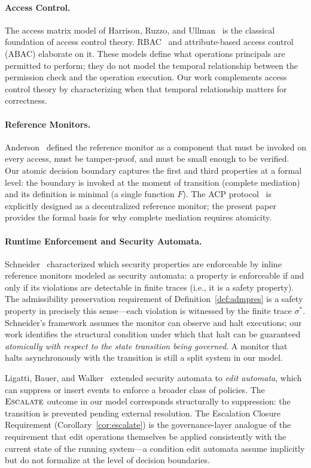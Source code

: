 \documentclass[11pt]{article}
\theoremstyle{plain}
\theoremstyle{definition}
\theoremstyle{remark}
\newcommand{\Escalate}{\textsc{Escalate}}
\begin{document}
\paragraph{Access Control.}
The access matrix model of Harrison, Ruzzo, and Ullman~\cite{hru76} is the
classical foundation of access control theory.  RBAC~\cite{sandhu96} and
attribute-based access control (ABAC) elaborate on it.  These models define
what operations principals are permitted to perform; they do not model the
temporal relationship between the permission check and the operation
execution.  Our work complements access control theory by characterizing when
that temporal relationship matters for correctness.

\paragraph{Reference Monitors.}
Anderson~\cite{anderson72} defined the reference monitor as a component that
must be invoked on every access, must be tamper-proof, and must be small
enough to be verified.  Our atomic decision boundary captures the first and
third properties at a formal level: the boundary is invoked at the moment of
transition (complete mediation) and its definition is minimal (a single
function $F$).  The ACP protocol~\cite{acp26} is explicitly designed as a
decentralized reference monitor; the present paper provides the formal basis
for why complete mediation requires atomicity.

\paragraph{Runtime Enforcement and Security Automata.}
Schneider~\cite{schneider00} characterized which security properties are
enforceable by inline reference monitors modeled as security automata: a
property is enforceable if and only if its violations are detectable in finite
traces (i.e., it is a safety property).  The admissibility preservation
requirement of Definition~\ref{def:admpres} is a safety property in precisely
this sense---each violation is witnessed by the finite trace $\sigma^*$.
Schneider's framework assumes the monitor can observe and halt executions; our
work identifies the structural condition under which that halt can be guaranteed
\emph{atomically with respect to the state transition being governed}.  A
monitor that halts asynchronously with the transition is still a split system
in our model.

Ligatti, Bauer, and Walker~\cite{ligatti05} extended security automata to
\emph{edit automata}, which can suppress or insert events to enforce a broader
class of policies.  The $\Escalate$ outcome in our model corresponds
structurally to suppression: the transition is prevented pending external
resolution.  The Escalation Closure Requirement (Corollary~\ref{cor:escalate})
is the governance-layer analogue of the requirement that edit operations
themselves be applied consistently with the current state of the running
system---a condition edit automata assume implicitly but do not formalize at
the level of decision boundaries.
\end{document}
